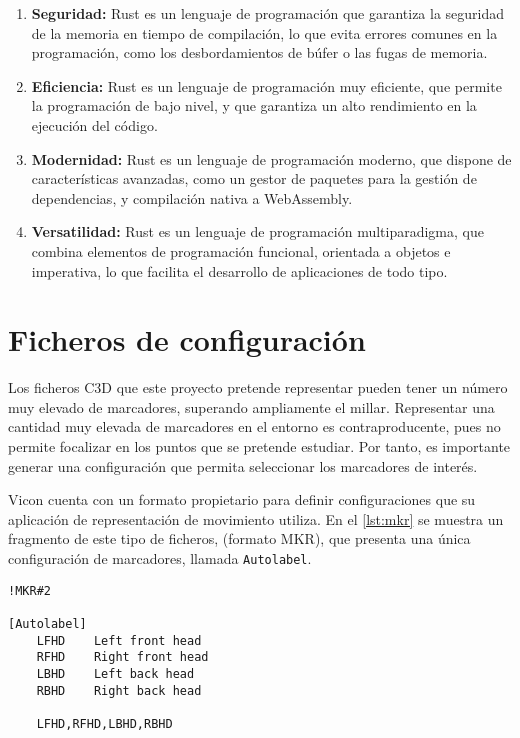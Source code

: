 \begin{enumerate}
    \item \textbf{Seguridad:} Rust es un lenguaje de programación que garantiza la seguridad de la memoria en tiempo de compilación, lo que evita errores comunes en la programación, como los desbordamientos de búfer o las fugas de memoria.
    \item \textbf{Eficiencia:} Rust es un lenguaje de programación muy eficiente, que permite la programación de bajo nivel, y que garantiza un alto rendimiento en la ejecución del código.
    \item \textbf{Modernidad:} Rust es un lenguaje de programación moderno, que dispone de características avanzadas, como un gestor de paquetes para la gestión de dependencias, y compilación nativa a WebAssembly.
    \item \textbf{Versatilidad:} Rust es un lenguaje de programación multiparadigma, que combina elementos de programación funcional, orientada a objetos e imperativa, lo que facilita el desarrollo de aplicaciones de todo tipo.
\end{enumerate}

\section{Ficheros de configuración} \label{sec:ficheros-configuracion}

Los ficheros \ac{C3D} que este proyecto pretende representar pueden tener un número muy elevado de marcadores, superando ampliamente el millar. Representar una cantidad muy elevada de marcadores en el entorno es contraproducente, pues no permite focalizar en los puntos que se pretende estudiar. Por tanto, es importante generar una configuración que permita seleccionar los marcadores de interés.

Vicon cuenta con un formato propietario para definir configuraciones que su aplicación de representación de movimiento utiliza. En el \autoref{lst:mkr} se muestra un fragmento de este tipo de ficheros, (formato MKR), que presenta una única configuración de marcadores, llamada \texttt{Autolabel}.

\newpage

\begin{lstlisting}[style=mystyle, caption={Fragmento de un fichero MKR}, label=lst:mkr]
!MKR#2

[Autolabel]
	LFHD	Left front head
	RFHD	Right front head
	LBHD	Left back head
	RBHD	Right back head

    LFHD,RFHD,LBHD,RBHD
\end{lstlisting}

